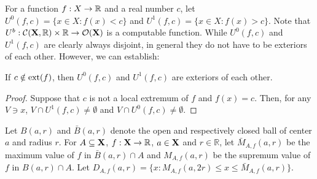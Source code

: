 \documentclass{eptcs-modified}
\begin{document}
For a function $f: X \to \mathbb{R}$ and a real number $c$,  let
$U^0(f, c) = \{x \in X : f(x) < c\}$ and
$U^1(f, c) = \{x \in X : f(x) > c\}$. Note that $U^b : \mathcal{C}(\mathbf{X},\mathbb{R}) \times \mathbb{R} \to \mathcal{O}(\mathbf{X})$ is a computable function. While $U^0(f,c)$ and $U^1(f,c)$ are clearly always disjoint, in general they do not have to be exteriors of each other. However, we can establish:


\begin{lemma}\label{lemma0}
If $c \notin \mathrm{ext}(f)$, then $U^0(f, c)$ and $U^1(f, c)$  are exteriors of each other.
\end{lemma}

\begin{proof}
  Suppose that $c$ is not a local extremum of $f$ and $f(x) = c$.
  Then, for any $V \ni x$, $V \cap U^1(f, c) \ne \emptyset$ and
  $V \cap U^0(f, c) \ne \emptyset$.
\end{proof}

Let $B(a, r)$ and $\bar{B}(a,r)$ denote the open and respectively closed ball of  center $a$ and radius $r$. For $A \subseteq \mathbf{X}$, $f : \mathbf{X} \to \mathbb{R}$, $a \in \mathbf{X}$ and $r \in \mathbb{R}$, let $\bar{M}_{A,f}(a,r)$ be the maximum value of $f$ in $\bar{B}(a, r) \cap A$ and $M_{A,f}(a,r)$ be the supremum value of $f$ in $B(a, r) \cap A$. Let $D_{A,f}(a, r) = \{x : M_{A,f}(a, 2r) \leq x \leq \bar{M}_{A,f}(a, r) \}$.
\end{document}
